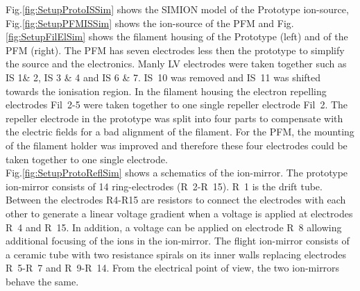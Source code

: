 	Fig.\ref{fig:SetupProtoISSim} shows the SIMION model of the Prototype ion-source, Fig.\ref{fig:SetupPFMISSim} shows the ion-source of the PFM and Fig.\ref{fig:SetupFilElSim} shows the filament housing of the Prototype (left) and of the PFM (right). The PFM has seven electrodes less then the prototype to simplify the source and the electronics. Manly LV electrodes were taken together such as IS 1\& 2, IS 3 \& 4 and IS 6 \& 7. IS~10 was removed and IS~11 was shifted towards the ionisation region. In the filament housing the electron repelling electrodes Fil~2-5 were taken together to one single repeller electrode Fil~2. The repeller electrode in the prototype was split into four parts to compensate with the electric fields for a bad alignment of the filament. For the PFM, the mounting of the filament holder was improved and therefore these four electrodes could be taken together to one single electrode.\\
	Fig.\ref{fig:SetupProtoReflSim} shows a schematics of the ion-mirror. The prototype ion-mirror consists of 14 ring-electrodes (R~2-R~15). R~1 is the drift tube. Between the electrodes R4-R15 are resistors to connect the electrodes with each other to generate a linear voltage gradient when a voltage is applied at electrodes R~4 and R~15. In addition, a voltage can be applied on electrode R~8 allowing additional focusing of the ions in the ion-mirror.	The flight ion-mirror consists of a ceramic tube with two resistance spirals on its inner walls replacing electrodes R~5-R~7 and R~9-R~14. From the electrical point of view, the two ion-mirrors behave the same.\\
